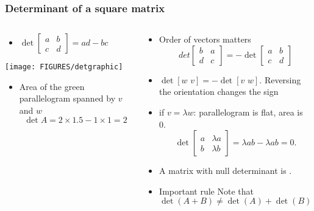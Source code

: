 \documentclass[8pt]{beamer}
\newcommand{\myemph}[1]{{\color{blue}{#1}}}
\begin{document}
\begin{frame}
  \frametitle{Determinant of a square matrix}
  \begin{columns}
    \begin{column}{0.5\textwidth}
      \begin{itemize}
      \item  $
       \det
       \begin{bmatrix}
         a & b\\ c & d
       \end{bmatrix}
       = ad - bc
       $
      \end{itemize}
       \begin{center}
         \texttt{[image: FIGURES/detgraphic]}  
       \end{center}
       \begin{itemize}
       \item    Area of the green parallelogram spanned by $v$ and $w$    
         $$
         \det A = 2\times 1.5 - 1\times 1 = 2
         $$
       \end{itemize}
     \end{column}
     \begin{column}{0.5\textwidth}
       \begin{itemize}
       \item Order of vectors matters
      $$
       det
       \begin{bmatrix}
         b & a\\ d & c
       \end{bmatrix}
       = - \det
       \begin{bmatrix}
         a & b\\ c & d
       \end{bmatrix}
       $$
     \item $\det [w\,\, v] = -\det[v\,\, w]$.
       Reversing the orientation changes the sign
     \item if $v = \lambda w$: parallelogram is flat, area is 0.
       $$
       \det
       \begin{bmatrix}
         a & \lambda a \\b &\lambda b
       \end{bmatrix}
       = \lambda a b - \lambda a b = 0.
       $$
     \item A matrix with null determinant is \myemph{singular}.
     \item Important rule  
       Note that $\det(A+B) \not= \det(A) + \det(B)$
       \end{itemize}
      \end{column}
  \end{columns}
\end{frame}
\end{document}
